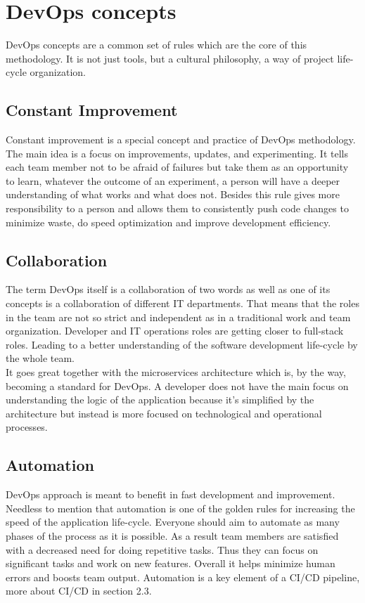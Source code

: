 \section{DevOps concepts} DevOps concepts are a common set of rules which are the core of this methodology. It is not just tools, but a cultural philosophy, a way of project life-cycle organization. 

\subsection{Constant Improvement} Constant improvement is a special concept and practice of DevOps methodology. The main idea is a focus on improvements, updates, and experimenting. It tells each team member not to be afraid of failures but take them as an opportunity to learn, whatever the outcome of an experiment, a person will have a deeper understanding of what works and what does not. Besides this rule gives more responsibility to a person and allows them to consistently push code changes to minimize waste, do speed optimization and improve development efficiency.


\subsection{Collaboration} The term DevOps itself is a collaboration of two words as well as one of its concepts is a collaboration of different IT departments. That means that the roles in the team are not so strict and independent as in a traditional work and team organization. Developer and IT operations roles are getting closer to full-stack roles. Leading to a better understanding of the software development life-cycle by the whole team.\\
It goes great together with the microservices architecture which is, by the way, becoming a standard for DevOps. A developer does not have the main focus on understanding the logic of the application because it's simplified by the architecture but instead is more focused on technological and operational processes. 

\subsection{Automation} DevOps approach is meant to benefit in fast development and improvement. Needless to mention that automation is one of the golden rules for increasing the speed of the application life-cycle. Everyone should aim to automate as many phases of the process as it is possible. As a result team members are satisfied with a decreased need for doing repetitive tasks. Thus they can focus on significant tasks and work on new features. Overall it helps minimize human errors and boosts team output. Automation is a key element of a CI/CD pipeline, more about CI/CD in section 2.3.

